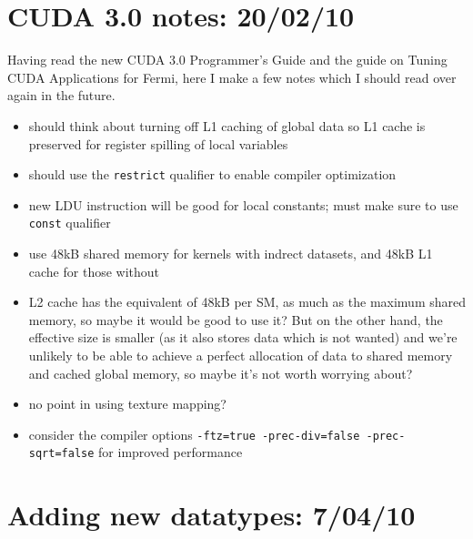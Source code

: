 \documentclass[12pt]{article}
\begin{document}
\section{CUDA 3.0 notes: 20/02/10}

Having read the new CUDA 3.0 Programmer's Guide and the guide on
Tuning CUDA Applications for Fermi, here I make a few notes which 
I should read over again in the future.

\begin{itemize}
\item
should think about turning off L1 caching of global data so L1 cache is 
preserved for register spilling of local variables

\item
should use the {\tt restrict} qualifier to enable compiler optimization

\item
new LDU instruction will be good for local constants; must make sure to use
{\tt const} qualifier

\item
use 48kB shared memory for kernels with indrect datasets, and
48kB L1 cache for those without

\item
L2 cache has the equivalent of 48kB per SM, as much as the maximum 
shared memory, so maybe it would be good to use it?  But on the other 
hand, the effective size is smaller (as it also stores data which is 
not wanted) and we're unlikely to be able to achieve a perfect 
allocation of data to shared memory and cached global memory, so 
maybe it's not worth worrying about?

\item
no point in using texture mapping?

\item
consider the compiler options 
{\tt -ftz=true -prec-div=false -prec-sqrt=false} 
for improved performance

\end{itemize}


\section{Adding new datatypes: 7/04/10}
\end{document}
